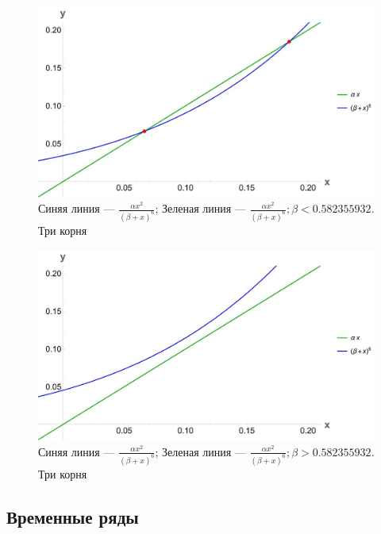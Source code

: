         \begin{figure}
            \centering
            \includegraphics[width=\textwidth]{images/main_intersect.jpg}

            \captionsetup{justification=centering}
            \caption{Синяя линия --- \(\frac{\alpha x^2}{(\beta + x)^6}\); Зеленая линия --- \(\frac{\alpha x^2}{(\beta + x)^6}; \beta < 0.582355932\). Три корня}
            \label{mainIntersect}
        \end{figure}

        \begin{figure}
            \centering
            \includegraphics[width=\textwidth]{images/main_over.jpg}

            \captionsetup{justification=centering}
            \caption{Синяя линия --- \(\frac{\alpha x^2}{(\beta + x)^6}\); Зеленая линия --- \(\frac{\alpha x^2}{(\beta + x)^6}; \beta > 0.582355932\). Три корня}
            \label{mainOver}
        \end{figure}

    \subsection{Временные ряды}
    
